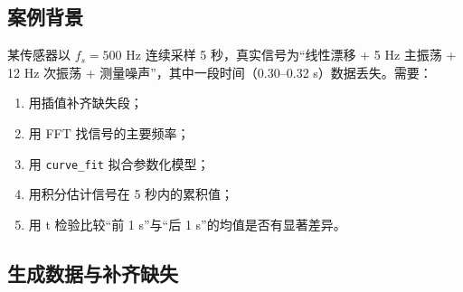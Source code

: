 \subsection{案例背景}\label{ux6848ux4f8bux80ccux666f}

某传感器以 \(f_s=500\) Hz 连续采样 5 秒，真实信号为``线性漂移 + 5 Hz
主振荡 + 12 Hz 次振荡 + 测量噪声''，其中一段时间（0.30--0.32
s）数据丢失。需要：

\begin{enumerate}
\def\labelenumi{\arabic{enumi}.}
\tightlist
\item
  用插值补齐缺失段；
\item
  用 FFT 找信号的主要频率；
\item
  用 \texttt{curve\_fit} 拟合参数化模型；
\item
  用积分估计信号在 5 秒内的累积值；
\item
  用 t 检验比较``前 1 s''与``后 1 s''的均值是否有显著差异。
\end{enumerate}

\subsection{生成数据与补齐缺失}\label{ux751fux6210ux6570ux636eux4e0eux8865ux9f50ux7f3aux5931}

